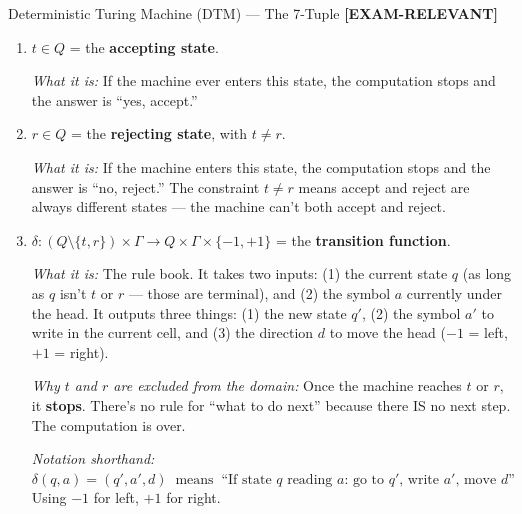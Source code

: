\documentclass[11pt,a4paper]{article}
\newcommand{\fitmath}[1]{\begin{adjustbox}{max width=\linewidth}$\displaystyle #1$\end{adjustbox}}
\newcommand{\kemark}{\textcolor{red!70!black}{\textbf{[EXAM-RELEVANT]}}}
\begin{document}
\begin{definitionbox}{Deterministic Turing Machine (DTM) --- The 7-Tuple \kemark}
\begin{enumerate}
\textit{What it is:} The state the machine is in at the very beginning, before it reads anything.

\textit{In our example:} $s = q_r$.

\item $t \in Q$ = the \textbf{accepting state}.

\textit{What it is:} If the machine ever enters this state, the computation stops and the answer is ``yes, accept.''

\item $r \in Q$ = the \textbf{rejecting state}, with $t \neq r$.

\textit{What it is:} If the machine enters this state, the computation stops and the answer is ``no, reject.'' The constraint $t \neq r$ means accept and reject are always different states --- the machine can't both accept and reject.

\item $\delta\colon (Q \setminus \{t, r\}) \times \Gamma \to Q \times \Gamma \times \{-1, +1\}$ = the \textbf{transition function}.

\textit{What it is:} The rule book. It takes two inputs: (1) the current state $q$ (as long as $q$ isn't $t$ or $r$ --- those are terminal), and (2) the symbol $a$ currently under the head. It outputs three things: (1) the new state $q'$, (2) the symbol $a'$ to write in the current cell, and (3) the direction $d$ to move the head ($-1$ = left, $+1$ = right).

\textit{Why $t$ and $r$ are excluded from the domain:} Once the machine reaches $t$ or $r$, it \textbf{stops}. There's no rule for ``what to do next'' because there IS no next step. The computation is over.

\textit{Notation shorthand:}
\fitmath{\delta(q, a) = (q', a', d) \;\;\text{means}\;\; \text{``If state } q \text{ reading } a\text{: go to } q'\text{, write } a'\text{, move } d\text{''}}
Using $-1$ for left, $+1$ for right.
\end{enumerate}
\end{definitionbox}
\end{document}
